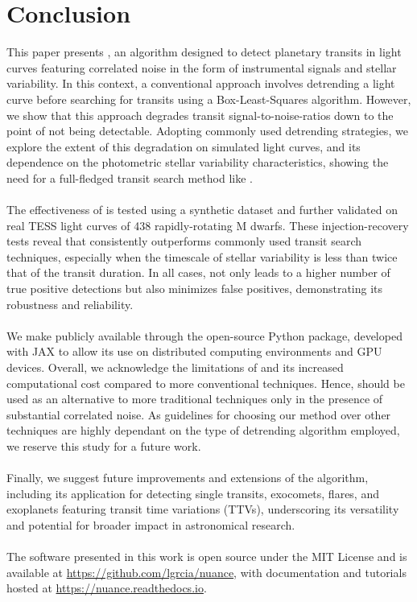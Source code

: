 \documentclass[modern]{aastex631}
\begin{document}
\newpage
\section{Conclusion}\label{conclusion}
This paper presents \nuancemethod{}, an algorithm designed to detect planetary transits in light curves featuring correlated noise in the form of instrumental signals and stellar variability. In this context, a conventional approach involves detrending a light curve before searching for transits using a Box-Least-Squares algorithm. However, we show that this approach degrades transit signal-to-noise-ratios down to the point of not being detectable. Adopting commonly used detrending strategies, we explore the extent of this degradation on simulated light curves, and its dependence on the photometric stellar variability characteristics, showing the need for a full-fledged transit search method like \nuancemethod{}.\\\\
The effectiveness of \nuancemethod{} is tested using a synthetic dataset and further validated on real TESS light curves of 438 rapidly-rotating M dwarfs. These injection-recovery tests reveal that \nuancemethod{} consistently outperforms commonly used transit search techniques, especially when the timescale of stellar variability is less than twice that of the transit duration. In all cases, \nuancemethod{} not only leads to a higher number of true positive detections but also minimizes false positives, demonstrating its robustness and reliability.\\\\
We make \nuancemethod{} publicly available through the \nuancecode{} open-source Python package, developed with \textsf{JAX} to allow its  use on distributed computing environments and GPU devices. Overall, we acknowledge the limitations of \nuancemethod{} and its increased computational cost compared to more conventional techniques. Hence, \nuancemethod{} should be used as an alternative to more traditional techniques only in the presence of substantial correlated noise. As guidelines for choosing our method over other techniques are highly dependant on the type of detrending algorithm employed, we reserve this study for a future work.\\\\
Finally, we suggest future improvements and extensions of the algorithm, including its application for detecting single transits, exocomets, flares, and exoplanets featuring transit time variations (TTVs), underscoring its versatility and potential for broader impact in astronomical research.
\\\\
The software presented in this work is open source under the MIT License and is
available at \href{https://github.com/lgrcia/nuance}{https://github.com/lgrcia/nuance}, with documentation and tutorials hosted at \href{https://nuance.readthedocs.io}{https://nuance.readthedocs.io}. 
\end{document}
